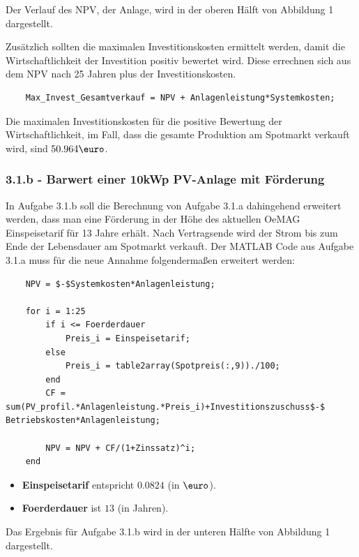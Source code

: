 \documentclass[a4paper,12pt]{article}
\begin{document}
	Der Verlauf des NPV, der Anlage, wird in der oberen Hälft von Abbildung 1 dargestellt.\\ \par
	\noindent Zusätzlich sollten die maximalen Investitionskosten ermittelt werden, damit die Wirtschaftlichkeit der Investition positiv bewertet wird. Diese errechnen sich aus dem NPV nach 25 Jahren plus der Investitionskosten.
	\begin{lstlisting}
	Max_Invest_Gesamtverkauf = NPV + Anlagenleistung*Systemkosten;
	\end{lstlisting}
	Die maximalen Investitionskosten für die positive Bewertung der Wirtschaftlichkeit, im Fall, dass die gesamte Produktion am Spotmarkt verkauft wird, sind $50.964\mbox{\euro}$.
	\subsubsection{3.1.b - Barwert einer 10kWp PV-Anlage mit Förderung}
	In Aufgabe 3.1.b soll die Berechnung von Aufgabe 3.1.a dahingehend erweitert werden, dass man eine Förderung in der Höhe des aktuellen OeMAG Einspeisetarif für 13 Jahre erhält. Nach Vertragsende wird der Strom bis zum Ende der Lebensdauer am Spotmarkt verkauft.\newline
	Der MATLAB Code aus Aufgabe 3.1.a muss für die neue Annahme folgendermaßen erweitert werden:
	\begin{lstlisting}
	NPV = $-$Systemkosten*Anlagenleistung;
	
	for i = 1:25
		if i <= Foerderdauer
			Preis_i = Einspeisetarif;
		else
			Preis_i = table2array(Spotpreis(:,9))./100;
		end
		CF = sum(PV_profil.*Anlagenleistung.*Preis_i)+Investitionszuschuss$-$ Betriebskosten*Anlagenleistung;

		NPV = NPV + CF/(1+Zinssatz)^i;
	end
	\end{lstlisting}
	\begin{itemize}
		\item \textbf{Einspeisetarif} entspricht $0.0824$ (in $\mbox{\euro}$).
		\item \textbf{Foerderdauer} ist $13$ (in Jahren).
	\end{itemize}
	Das Ergebnis für Aufgabe 3.1.b wird in der unteren Hälfte von Abbildung 1 dargestellt.
\end{document}
